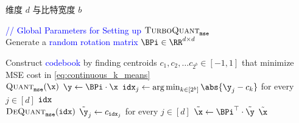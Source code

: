 \documentclass[11pt]{ctexart}
\newcommand{\TurboQuant}{\textsc{TurboQuant}\xspace}
\let\cref\ref
\begin{document}
\begin{algorithm}[t!]
\caption{$\TurboQuant_{\tt mse}$：MSE 优化}\label{alg_turboquant_mse}
\begin{algorithmic}[1]
    维度 $d$ 与比特宽度 $b$

    {\ttfamily\textcolor{blue}{// Global Parameters for Setting up $\TurboQuant_{\tt mse}$}} \\
    \STATE Generate a {\ttfamily\textcolor{blue}{random rotation matrix}} $\BPi \in \RR^{d \times d}$

    \STATE Construct {\ttfamily\textcolor{blue}{codebook}} by finding centroids $c_1, c_2, \ldots c_{2^b} \in [-1, 1]$ that minimize MSE cost in \cref{eq:continuous_k_means} \label{alg:codebook_construction}
   \\\hrulefill
    $\textsc{Quant}_{\tt mse} ( \x )$
   \STATE $\y \gets \BPi \cdot \x$\label{line_y}
   \STATE ${\tt idx}_j \gets \arg\min_{k \in [2^b]}  \abs{\y_j - c_k}$ for every $j \in [d]$\label{line_idx} \hfill {}
    ${\tt idx}$
   \\\hrulefill
    $\textsc{DeQuant}_{\tt mse} ({\tt idx})$
   \STATE $\tilde{\y}_j \gets c_{{\tt idx}_j}$ for every $j \in [d]$\label{y_tilde}
   \STATE $\tilde{\x} \gets \BPi^\top \cdot \tilde{\y}$
   $\tilde{\x}$ 
\end{algorithmic}
\end{algorithm}
\end{document}
